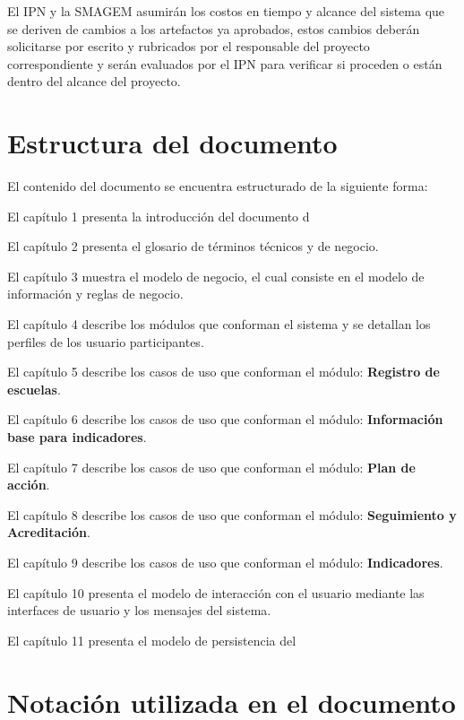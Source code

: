     El IPN y la SMAGEM asumirán los costos en tiempo y alcance del sistema que se deriven de cambios a los artefactos ya aprobados, estos cambios deberán solicitarse por escrito y rubricados por el responsable del proyecto correspondiente y serán evaluados por el IPN para verificar si proceden o están dentro del alcance del proyecto.

\section{Estructura del documento}

    El contenido del documento se encuentra estructurado de la siguiente forma:

    \begin{Citemize}
    \item El capítulo 1 presenta la introducción del documento d
	\item El capítulo 2 presenta el glosario de términos técnicos y de negocio.
	\item El capítulo 3 muestra el modelo de negocio, el cual consiste en el modelo de información y reglas de negocio.
	\item El capítulo 4 describe los módulos que conforman el sistema y se detallan los perfiles de los usuario participantes.
	\item El capítulo 5 describe los casos de uso que conforman el módulo: {\bf Registro de escuelas}.
	\item El capítulo 6 describe los casos de uso que conforman el módulo: {\bf Información base para indicadores}.
	\item El capítulo 7 describe los casos de uso que conforman el módulo: {\bf Plan de acción}.
	\item El capítulo 8 describe los casos de uso que conforman el módulo: {\bf Seguimiento y Acreditación}.
	\item El capítulo 9 describe los casos de uso que conforman el módulo: {\bf Indicadores}.	
	\item El capítulo 10 presenta el modelo de interacción con el usuario mediante las interfaces de usuario y los mensajes del sistema.
	\item El capítulo 11 presenta el modelo de persistencia del
    \end{Citemize}

\section{Notación utilizada en el documento}

